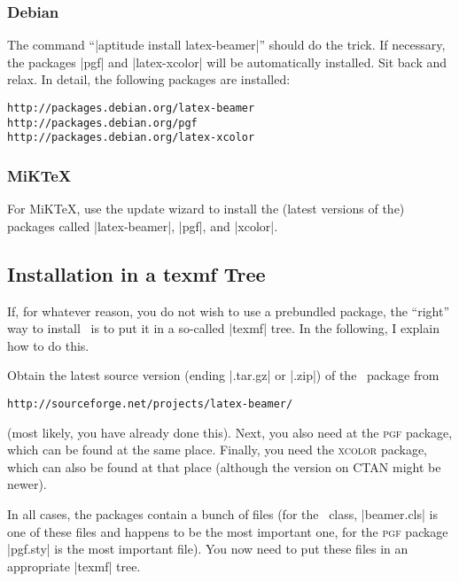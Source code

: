 \subsubsection{Debian}

The command ``|aptitude install latex-beamer|'' should do the
trick. If necessary, the packages |pgf| and |latex-xcolor| will be
automatically installed. Sit back and relax. In detail, the following
packages are installed: 
\begin{verbatim}
http://packages.debian.org/latex-beamer
http://packages.debian.org/pgf
http://packages.debian.org/latex-xcolor
\end{verbatim}


\subsubsection{MiKTeX}

For MiK\TeX, use the update wizard to install the (latest versions of
the) packages called |latex-beamer|, |pgf|, and |xcolor|. 




\subsection{Installation in a texmf Tree}

If, for whatever reason, you do not wish to use a prebundled package,
the ``right'' way to install \beamer\ is to put it in a so-called
|texmf| tree. In the following, I explain how to do this.

Obtain the latest source version (ending |.tar.gz| or |.zip|) of the \beamer\
package from
\begin{verbatim}
http://sourceforge.net/projects/latex-beamer/
\end{verbatim}
(most likely, you have already done this). Next, you also need at
the \textsc{pgf} package, which can be found at the same
place. Finally, you need the  \textsc{xcolor} package, which can also
be found at that place (although the version on CTAN might be newer).

In all cases, the packages contain a bunch of files (for the \beamer\
class, |beamer.cls| is one of these files and happens to be the
most important one, for the \textsc{pgf} package |pgf.sty| is
the most important file). You now need to put these files in an
appropriate |texmf| tree. 

